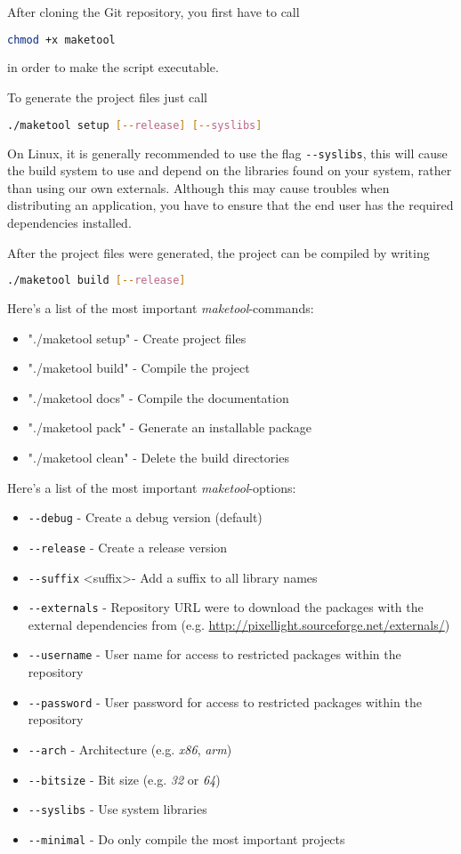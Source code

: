 After cloning the Git repository, you first have to call
\begin{lstlisting}[language=sh]
chmod +x maketool
\end{lstlisting}
in order to make the script executable.

To generate the project files just call
\begin{lstlisting}[language=sh]
./maketool setup [--release] [--syslibs]
\end{lstlisting}

On Linux, it is generally recommended to use the flag \verb+--syslibs+, this will cause the build system to use and depend on the libraries found on your system, rather than using our own externals. Although this may cause troubles when distributing an application, you have to ensure that the end user has the required dependencies installed.

After the project files were generated, the project can be compiled by writing
\begin{lstlisting}[language=sh]
./maketool build [--release]
\end{lstlisting}

Here's a list of the most important \emph{maketool}-commands:
\begin{itemize}
\item{"./maketool setup"	- Create project files}
\item{"./maketool build"	- Compile the project}
\item{"./maketool docs"		- Compile the documentation}
\item{"./maketool pack"		- Generate an installable package}
\item{"./maketool clean"	- Delete the build directories}
\end{itemize}

Here's a list of the most important \emph{maketool}-options:
\begin{itemize}
\item{\verb+--debug+								- Create a debug version (default)}
\item{\verb+--release+								- Create a release version}
\item{\verb+--suffix+ \textless suffix\textgreater	- Add a suffix to all library names}
\item{\verb+--externals+							- Repository \ac{URL} were to download the packages with the external dependencies from (e.g. \url{http://pixellight.sourceforge.net/externals/})}
\item{\verb+--username+								- User name for access to restricted packages within the repository}
\item{\verb+--password+								- User password for access to restricted packages within the repository}
\item{\verb+--arch+									- Architecture (e.g. \emph{x86}, \emph{arm})}
\item{\verb+--bitsize+								- Bit size (e.g. \emph{32} or \emph{64})}
\item{\verb+--syslibs+								- Use system libraries}
\item{\verb+--minimal+								- Do only compile the most important projects}
\end{itemize}

